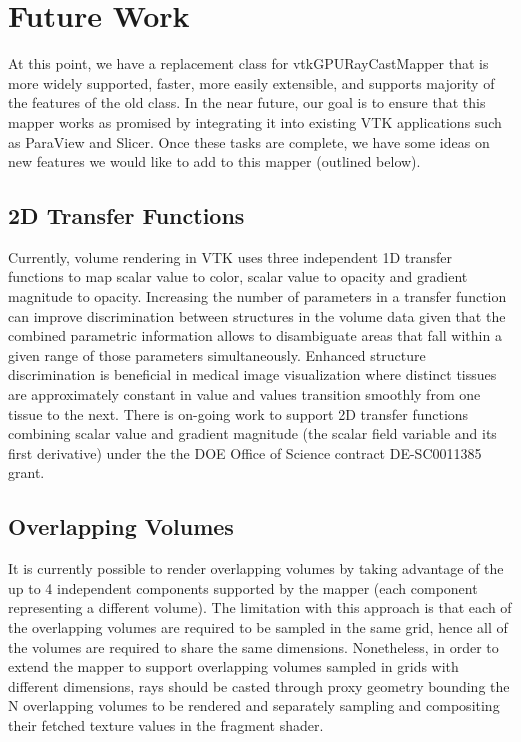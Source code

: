 \section{Future Work}
\label{future-work}
At this point, we have a replacement class for vtkGPURayCastMapper that is more
widely supported, faster, more easily extensible, and supports majority of the
features of the old class. In the near future, our goal is to ensure that this
mapper works as promised by integrating it into existing VTK applications such
as ParaView and Slicer. Once these tasks are complete, we have some ideas on new
features we would like to add to this mapper (outlined below).

\subsection{2D Transfer Functions}
\label{2d-transfer-functions}
Currently, volume rendering in VTK uses three independent 1D transfer functions
to map scalar value to color, scalar value to opacity and gradient magnitude to
opacity. Increasing the number of parameters in a transfer function can improve
discrimination between structures in the volume data given that the combined
parametric information allows to disambiguate areas that fall within a given range
of those parameters simultaneously. Enhanced structure discrimination is beneficial
in medical image visualization where distinct tissues are approximately constant
in value and values transition smoothly from one tissue to the next. There is on-going
work to support 2D transfer functions combining scalar value and gradient magnitude
(the scalar field variable and its first derivative) under the the DOE Office of
Science contract DE-SC0011385 grant.

\subsection{Overlapping Volumes}
\label{overlapping-volumes}
It is currently possible to render overlapping volumes by taking advantage of
the up to 4 independent components supported by the mapper (each component
representing a different volume).
The limitation with this approach is that each of the overlapping volumes are
required to be sampled in the same grid, hence all of the volumes are required
to share the same dimensions.  Nonetheless, in order to extend the mapper to
support overlapping volumes sampled in grids with different dimensions, rays
should be casted through proxy geometry bounding the N overlapping volumes to be
rendered and separately sampling and compositing their fetched texture values in
the fragment shader.

